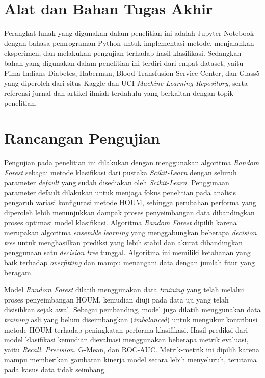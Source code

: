 \section{Alat dan Bahan Tugas Akhir} \label{III.Alat dan Bahan}
Perangkat lunak yang digunakan dalam penelitian ini adalah Jupyter Notebook dengan bahasa pemrograman Python untuk implementasi metode, menjalankan eksperimen, dan melakukan pengujian terhadap hasil klasifikasi. Sedangkan bahan yang digunakan dalam penelitian ini terdiri dari empat dataset, yaitu Pima Indians Diabetes, Haberman, Blood Transfusion Service Center, dan Glass5 yang diperoleh dari situs Kaggle dan UCI \textit{Machine Learning Repository}, serta referensi jurnal dan artikel ilmiah terdahulu yang berkaitan dengan topik penelitian.

\section{Rancangan Pengujian} \label{III.Pengujian}

Pengujian pada penelitian ini dilakukan dengan menggunakan algoritma \textit{Random Forest} sebagai metode klasifikasi dari pustaka \textit{Scikit-Learn} dengan seluruh parameter \textit{default} yang sudah disediakan oleh \textit{Scikit-Learn}. Penggunaan parameter default dilakukan untuk menjaga fokus penelitian pada analisis pengaruh variasi konfigurasi metode HOUM, sehingga perubahan performa yang diperoleh lebih menunjukkan dampak proses penyeimbangan data dibandingkan proses optimasi model klasifikasi. Algoritma \textit{Random Forest} dipilih karena merupakan algoritma \textit{ensemble learning} yang menggabungkan beberapa \textit{decision tree} untuk menghasilkan prediksi yang lebih stabil dan akurat dibandingkan penggunaan satu \textit{decision tree} tunggal. Algoritma ini memiliki ketahanan yang baik terhadap \textit{overfitting} dan mampu menangani data dengan jumlah fitur yang beragam. 

Model \textit{Random Forest} dilatih menggunakan data \textit{training} yang telah melalui proses penyeimbangan HOUM, kemudian diuji pada data uji yang telah disisihkan sejak awal. Sebagai pembanding, model juga dilatih menggunakan data \textit{training} asli yang belum diseimbangkan (\textit{imbalanced}) untuk mengukur kontribusi metode HOUM terhadap peningkatan performa klasifikasi. Hasil prediksi dari model klasifikasi kemudian dievaluasi menggunakan beberapa metrik evaluasi, yaitu \textit{Recall}, \textit{Precision}, G-Mean, dan ROC-AUC. Metrik-metrik ini dipilih karena mampu memberikan gambaran kinerja model secara lebih menyeluruh, terutama pada kasus data tidak seimbang.

